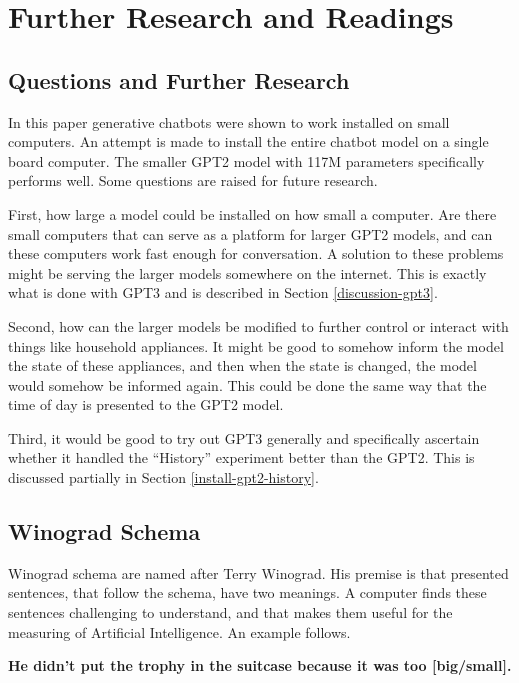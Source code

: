\chapter{Further Research and Readings}

\section{Questions and Further Research}

In this paper generative chatbots were shown to work installed on small computers. An attempt is made to install the entire chatbot model on a single board computer. The smaller GPT2 model with 117M parameters specifically performs well. Some questions are raised for future research.

First, how large a model could be installed on how small a computer. Are there small computers that can serve as a platform for larger GPT2 models, and can these computers work fast enough for conversation. A solution to these problems might be serving the larger models somewhere on the internet. This is exactly what is done with GPT3 and is described in Section \ref{discussion-gpt3}.

Second, how can the larger models be modified to further control or interact with things like household appliances. It might be good to somehow inform the model the state of these appliances, and then when the state is changed, the model would somehow be informed again. This could be done the same way that the time of day is presented to the GPT2 model.

Third, it would be good to try out GPT3 generally and specifically ascertain whether it handled the ``History'' experiment better than the GPT2. This is discussed partially in Section \ref{install-gpt2-history}. 


\section{Winograd Schema}

Winograd schema are named after Terry Winograd. His premise is that presented sentences, that follow the schema, have two meanings. A computer finds these sentences challenging to understand, and that makes them useful for the measuring of Artificial Intelligence. An example follows.

\begin{center}
	\textbf{He didn't put the trophy in the suitcase because it was too [big/small].}
\end{center}

